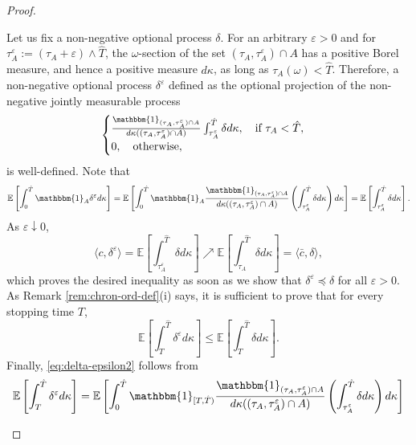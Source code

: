 \documentclass[11pt, oneside]{article}   	%
\theoremstyle{plain}
\theoremstyle{definition}
\theoremstyle{remark}
\begin{document}
\begin{proof}
\begin{enumerate}
Let us fix a non-negative optional process $\delta$. For an arbitrary $\varepsilon>0$ and for $\tau_A^\varepsilon:=(\tau_A+\varepsilon)\wedge\hat{T}$, the $\omega$-section of the set $(\tau_A,\tau_A^\varepsilon)\cap A$ has a positive Borel measure, and hence a positive measure $d\kappa$, as long as $\tau_A(\omega)<\hat{T}$. Therefore, a non-negative optional process $\delta^\varepsilon$ defined as the optional projection of the non-negative jointly measurable process
\begin{equation}\label{eq:delta-eps-def}
\begin{cases}
\frac{\mathbbm{1}_{(\tau_A,\tau_A^\varepsilon)\cap A}}{d\kappa((\tau_A,\tau_A^\varepsilon)\cap A)}\int_{\tau_A^\varepsilon}^{\hat{T}}\delta d\kappa,\quad\text{if }\tau_A<\hat{T},\\
0,\quad\text{otherwise},
\end{cases}
\end{equation}
is well-defined. Note that
\begin{equation*}
\mathbb{E}\left[\int_0^{\hat{T}} \mathbbm{1}_A\delta^\varepsilon d\kappa\right]=\mathbb{E}\left[\int_0^{\hat{T}} \mathbbm{1}_A\frac{\mathbbm{1}_{(\tau_A,\tau_A^\varepsilon)\cap A}}{d\kappa((\tau_A,\tau_A^\varepsilon)\cap A)}\left(\int_{\tau_A^\varepsilon}^{\hat{T}}\delta d\kappa\right) d\kappa\right]=\mathbb{E}\left[\int_{\tau_A^\varepsilon}^{\hat{T}}\delta d\kappa\right].
\end{equation*}
As $\varepsilon\downarrow 0$,
\begin{equation}\label{eq:eps-conv}
\langle c,\delta^\varepsilon \rangle=\mathbb{E}\left[\int_{\tau_A^\varepsilon}^{\hat{T}}\delta d\kappa\right]\nearrow\mathbb{E}\left[\int_{\tau_A}^{\hat{T}}\delta d\kappa\right]=\langle \bar{c},\delta \rangle,
\end{equation}
which proves the desired inequality as soon as we show that $\delta^\varepsilon\preceq\delta$ for all $\varepsilon>0$. As Remark \ref{rem:chron-ord-def}(i) says, it is sufficient to prove that for every stopping time $T$,
\begin{equation}\label{eq:delta-epsilon2}
\mathbb{E}\left[\int_T^{\hat{T}}\delta^\varepsilon d\kappa\right]\leq \mathbb{E}\left[\int_T^{\hat{T}}\delta d\kappa\right].
\end{equation}
Finally, \eqref{eq:delta-epsilon2} follows from
\begin{equation*}
\begin{aligned}
\mathbb{E}\left[\int_T^{\hat{T}}\delta^\varepsilon d\kappa\right]&=\mathbb{E}\left[\int_0^{\hat{T}}\mathbbm{1}_{[T,{\hat{T}})}\frac{\mathbbm{1}_{(\tau_A,\tau_A^\varepsilon)\cap A}}{d\kappa((\tau_A,\tau_A^\varepsilon)\cap A)}\left(\int_{\tau_A^\varepsilon}^{\hat{T}}\delta d\kappa\right)d\kappa\right]\\

\end{aligned}
\end{equation*}
\end{enumerate}
\end{proof}
\end{document}

